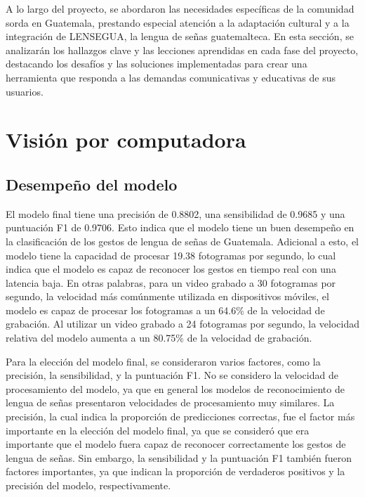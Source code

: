 A lo largo del proyecto, se abordaron las necesidades específicas de la comunidad sorda en Guatemala, prestando especial atención a la adaptación cultural y a la integración de LENSEGUA, la lengua de señas guatemalteca. En esta sección, se analizarán los hallazgos clave y las lecciones aprendidas en cada fase del proyecto, destacando los desafíos y las soluciones implementadas para crear una herramienta que responda a las demandas comunicativas y educativas de sus usuarios.


\section{Visión por computadora} 

\subsection*{Desempeño del modelo}

El modelo final tiene una precisión de 0.8802, una sensibilidad de 0.9685 y una puntuación F1 de 0.9706.
Esto indica que el modelo tiene un buen desempeño en la clasificación de los gestos de lengua de señas de Guatemala.
Adicional a esto, el modelo tiene la capacidad de procesar 19.38 fotogramas por segundo, lo cual indica que el modelo es capaz de reconocer los gestos en tiempo real con una latencia baja.
En otras palabras, para un video grabado a 30 fotogramas por segundo, la velocidad más comúnmente utilizada en dispositivos móviles, el modelo es capaz de procesar los fotogramas a un 64.6\% de la velocidad de grabación.
Al utilizar un video grabado a 24 fotogramas por segundo, la velocidad relativa del modelo aumenta a un 80.75\% de la velocidad de grabación.

Para la elección del modelo final, se consideraron varios factores, como la precisión, la sensibilidad, y la puntuación F1.
No se considero la velocidad de procesamiento del modelo, ya que en general los modelos de reconocimiento de lengua de señas presentaron velocidades de procesamiento muy similares.
La precisión, la cual indica la proporción de predicciones correctas, fue el factor más importante en la elección del modelo final, ya que se consideró que era importante que el modelo fuera capaz de reconocer correctamente los gestos de lengua de señas.
Sin embargo, la sensibilidad y la puntuación F1 también fueron factores importantes, ya que indican la proporción de verdaderos positivos y la precisión del modelo, respectivamente.

